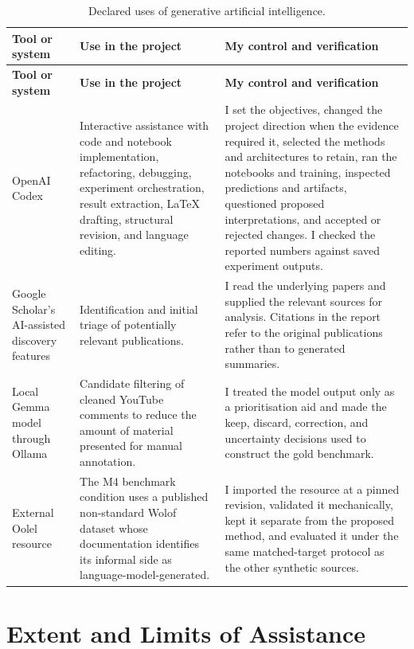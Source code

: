 \documentclass[12pt, a4paper, twoside, openany]{report}
\begin{document}
\begin{longtable}{p{3.1cm}p{5.2cm}p{5.6cm}}
  \caption{Declared uses of generative artificial intelligence.}\label{tab:ai-use}\\
  \toprule
  \textbf{Tool or system} & \textbf{Use in the project} & \textbf{My control and verification} \\
  \midrule
  \endfirsthead
  \toprule
  \textbf{Tool or system} & \textbf{Use in the project} & \textbf{My control and verification} \\
  \midrule
  \endhead
  OpenAI Codex & Interactive assistance with code and notebook implementation, refactoring, debugging, experiment orchestration, result extraction, LaTeX drafting, structural revision, and language editing. & I set the objectives, changed the project direction when the evidence required it, selected the methods and architectures to retain, ran the notebooks and training, inspected predictions and artifacts, questioned proposed interpretations, and accepted or rejected changes. I checked the reported numbers against saved experiment outputs. \\
  Google Scholar's AI-assisted discovery features & Identification and initial triage of potentially relevant publications. & I read the underlying papers and supplied the relevant sources for analysis. Citations in the report refer to the original publications rather than to generated summaries. \\
  Local Gemma model through Ollama & Candidate filtering of cleaned YouTube comments to reduce the amount of material presented for manual annotation. & I treated the model output only as a prioritisation aid and made the keep, discard, correction, and uncertainty decisions used to construct the gold benchmark. \\
  External Oolel resource & The M4 benchmark condition uses a published non-standard Wolof dataset whose documentation identifies its informal side as language-model-generated. & I imported the resource at a pinned revision, validated it mechanically, kept it separate from the proposed method, and evaluated it under the same matched-target protocol as the other synthetic sources. \\
  \bottomrule
\end{longtable}

\section{Extent and Limits of Assistance}
\end{document}
